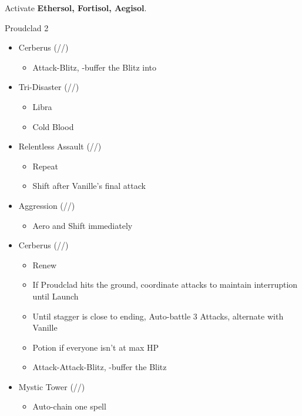 \documentclass{report}
\begin{document}
Activate \textbf{Ethersol, Fortisol, Aegisol}.
\renewcommand{\first}{[1] Aggression (\rav/\com/\com)}
\renewcommand{\second}{[2] Cerberus (\com/\com/\com)}
\renewcommand{\third}{[3] Mystic Tower (\rav/\sen/\rav)}
\renewcommand{\fourth}{[4] Solidarity (\com/\sen/\med)}
\renewcommand{\fifth}{[5] Relentless Assault (\rav/\com/\rav)}
\renewcommand{\sixth}{[6] Tri-Disaster (\rav/\rav/\rav)}
\begin{battle}{Proudclad 2}
\begin{multicols}{2}
\begin{itemize}
    \item \second
    \begin{itemize}
        \item Attack-Blitz, \rav-buffer the Blitz into
    \end{itemize}
    \item \sixth
    \begin{itemize}
        \item Libra
        \item Cold Blood
    \end{itemize}
    \item \fifth
    \begin{itemize}
        \item Repeat
        \item Shift after Vanille's final attack
    \end{itemize}
    \item \first
    \begin{itemize}
        \item Aero and Shift immediately
    \end{itemize}
    \item \second
    \begin{itemize}
        \item Renew
        \item If Proudclad hits the ground, coordinate attacks to maintain interruption until Launch
        \item Until stagger is close to ending, Auto-battle 3 Attacks, alternate with Vanille
        \item Potion if everyone isn't at max HP
        \item Attack-Attack-Blitz, \rav-buffer the Blitz
    \end{itemize}
    \item \third
    \begin{itemize}
        \item Auto-chain one spell

\end{itemize}
\end{itemize}
\end{multicols}
\end{battle}
\end{document}
